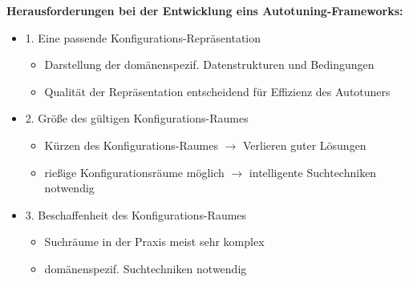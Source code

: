     \begin{frame}
    
    \textbf{Herausforderungen bei der Entwicklung eins Autotuning-Frameworks:}
    
    \begin{itemize}
       
    \item 1. Eine passende Konfigurations-Repräsentation
        \begin{itemize}
          \item Darstellung der domänenspezif. Datenstrukturen und Bedingungen
          \item Qualität der Repräsentation entscheidend für Effizienz des Autotuners \newline
        \end{itemize}
        
    \item 2. Größe des gültigen Konfigurations-Raumes
        \begin{itemize}
          \item Kürzen des Konfigurations-Raumes $\rightarrow$ Verlieren guter Lösungen
          
          \item rießige Konfigurationsräume möglich $\rightarrow$  intelligente Suchtechniken notwendig \newline
        \end{itemize}
        
    \item 3. Beschaffenheit des Konfigurations-Raumes
      \begin{itemize}
        \item Suchräume in der Praxis meist sehr komplex 
        \item domänenspezif. Suchtechniken notwendig
        
      \end{itemize}
    \end{itemize}
        
    \end{frame}
    

